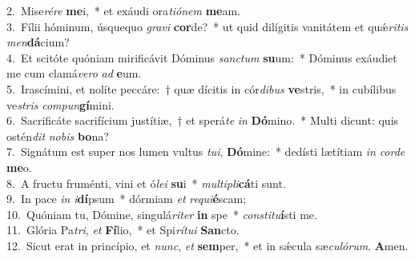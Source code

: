 {2.~}Mise\textit{ré}\textit{re} \textbf{me}i,~* et exáudi ora\textit{ti}\textit{ó}\textit{nem} \textbf{me}am.\\
{3.~}Fílii hóminum, úsquequo \textit{gra}\textit{vi} \textbf{cor}de?~* ut quid dilígitis vanitátem et quǽ\textit{ri}\textit{tis} \textit{men}\textbf{dá}cium?\\
{4.~}Et scitóte quóniam mirificávit Dóminus \textit{san}\textit{ctum} \textbf{su}um:~* Dóminus exáudiet me cum clamá\textit{ve}\textit{ro} \textit{ad} \textbf{e}um.\\
{5.~}Irascímini, et nolíte peccáre:~† quæ dícitis in cór\textit{di}\textit{bus} \textbf{ve}stris,~* in cubílibus ve\textit{stris} \textit{com}\textit{pun}\textbf{gí}mini.\\
{6.~}Sacrificáte sacrifícium justítiæ,~† et sperá\textit{te} \textit{in} \textbf{Dó}mino.~* Multi dicunt: quis ostén\textit{dit} \textit{no}\textit{bis} \textbf{bo}na?\\
{7.~}Signátum est super nos lumen vultus \textit{tu}\textit{i}, \textbf{Dó}mine:~* dedísti lætítiam \textit{in} \textit{cor}\textit{de} \textbf{me}o.\\
{8.~}A fructu fruménti, vini et ó\textit{le}\textit{i} \textbf{su}i~* \textit{mul}\textit{ti}\textit{pli}\textbf{cá}ti sunt.\\
{9.~}In pace \textit{in} \textit{i}\textbf{dí}psum~* dórmiam \textit{et} \textit{re}\textit{qui}\textbf{é}scam;\\
{10.~}Quóniam tu, Dómine, singulá\textit{ri}\textit{ter} \textbf{in} spe~* \textit{con}\textit{sti}\textit{tu}\textbf{í}sti me.\\
{11.~}Glória Pa\textit{tri}, \textit{et} \textbf{Fí}lio,~* et Spi\textit{rí}\textit{tu}\textit{i} \textbf{San}cto.\\
{12.~}Sicut erat in princípio, et \textit{nunc}, \textit{et} \textbf{sem}per,~* et in sǽcula sæ\textit{cu}\textit{ló}\textit{rum}. \textbf{A}men.\\
